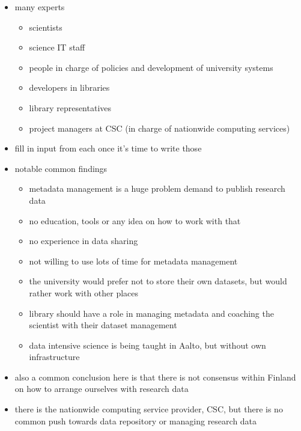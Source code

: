 \begin{itemize}
    \item many experts
        \begin{itemize}
            \item scientists
            \item science IT staff
            \item people in charge of policies and development of university
                  systems
            \item developers in libraries
            \item library representatives
            \item project managers at CSC (in charge of nationwide computing
                  services)
        \end{itemize}
        \item fill in input from each once it's time to write those
        \item notable common findings
        \begin{itemize}
            \item metadata management is a huge problem
         demand to publish research data   \item no education, tools or any idea on how to work with that
            \item no experience in data sharing
            \item not willing to use lots of time for metadata management
            \item the university would prefer not to store their own
                  datasets, but would rather work with other places
            \item library should have a role in managing metadata and coaching
                  the scientist with their dataset management
            \item data intensive science is being taught in Aalto, but without
                  own infrastructure
        \end{itemize}
        \item also a common conclusion here is that there is not consensus
              within Finland on how to arrange ourselves with research data
        \item there is the nationwide computing service provider, CSC, but
              there is no common push towards data repository or managing
              research data
\end{itemize}

